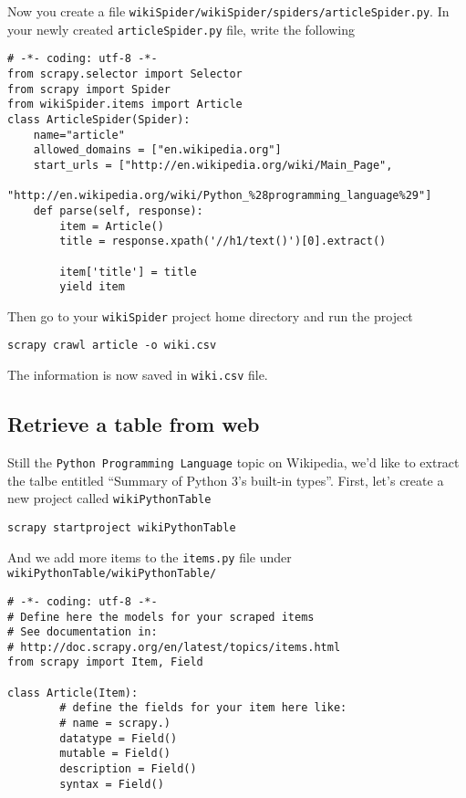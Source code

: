 \documentclass{article}
\begin{document}
    Now you create a file
\texttt{wikiSpider/wikiSpider/spiders/articleSpider.py}. In your newly
created \texttt{articleSpider.py} file, write the following

\begin{verbatim}
# -*- coding: utf-8 -*-
from scrapy.selector import Selector
from scrapy import Spider
from wikiSpider.items import Article
class ArticleSpider(Spider):
    name="article"
    allowed_domains = ["en.wikipedia.org"]
    start_urls = ["http://en.wikipedia.org/wiki/Main_Page",
                  "http://en.wikipedia.org/wiki/Python_%28programming_language%29"]
    def parse(self, response):
        item = Article()
        title = response.xpath('//h1/text()')[0].extract()

        item['title'] = title
        yield item
\end{verbatim}

    Then go to your \texttt{wikiSpider} project home directory and run the
project

\begin{verbatim}
scrapy crawl article -o wiki.csv
\end{verbatim}

The information is now saved in \texttt{wiki.csv} file.

    \subsection{Retrieve a table from web}\label{retrieve-a-table-from-web}

Still the \texttt{Python Programming Language} topic on Wikipedia, we'd
like to extract the talbe entitled ``Summary of Python 3's built-in
types''. First, let's create a new project called
\texttt{wikiPythonTable}

\begin{verbatim}
scrapy startproject wikiPythonTable
\end{verbatim}

    And we add more items to the \texttt{items.py} file under
\texttt{wikiPythonTable/wikiPythonTable/}

\begin{verbatim}
# -*- coding: utf-8 -*-
# Define here the models for your scraped items
# See documentation in:
# http://doc.scrapy.org/en/latest/topics/items.html
from scrapy import Item, Field

class Article(Item):
        # define the fields for your item here like:
        # name = scrapy.)
        datatype = Field()
        mutable = Field()
        description = Field()
        syntax = Field()
\end{verbatim}
\end{document}
